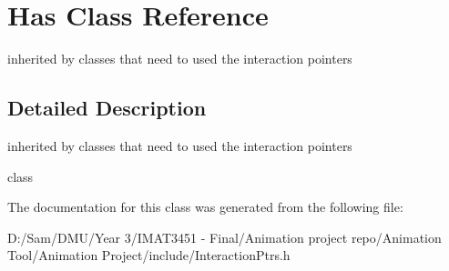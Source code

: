 \hypertarget{class_has}{}\section{Has Class Reference}
\label{class_has}


inherited by classes that need to used the interaction pointers  




\subsection{Detailed Description}
inherited by classes that need to used the interaction pointers 

class 

The documentation for this class was generated from the following file\+:\begin{DoxyCompactItemize}
\item 
D\+:/\+Sam/\+D\+M\+U/\+Year 3/\+I\+M\+A\+T3451 -\/ Final/\+Animation project repo/\+Animation Tool/\+Animation Project/include/Interaction\+Ptrs.\+h\end{DoxyCompactItemize}
